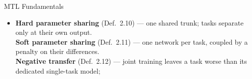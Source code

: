 \documentclass{beamer}
\begin{document}
\begin{frame}{MTL Fundamentals}
    \begin{itemize}\setlength{\itemsep}{1.1ex}
        \item \textbf{Hard parameter sharing} (Def.~2.10) --- one shared trunk; tasks separate
              only at their own output.\\
              \textbf{Soft parameter sharing} (Def.~2.11) --- one network per task, coupled by a
              penalty on their differences.\\
              \textbf{Negative transfer} (Def.~2.12) --- joint training leaves a task worse than
              its dedicated single-task model;
              \vspace{1.2mm}%

\end{itemize}
\end{frame}
\end{document}
